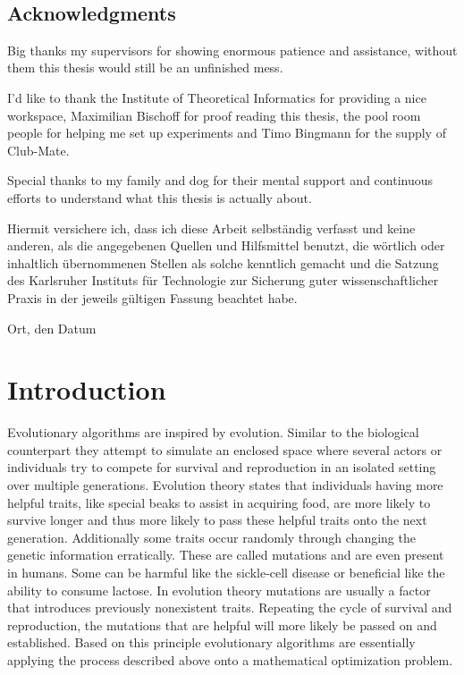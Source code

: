 \documentclass[a4paper,12pt,titlepage, BCOR7mm,headsepline]{scrbook}
\numberwithin{equation}{section}
\begin{document}
\vfill\vfill\vfill
\ 
\newpage
\clearpage
\ 
\newpage
\clearpage

\section*{Acknowledgments}
Big thanks my supervisors for showing enormous patience and assistance, without them this thesis would still be an unfinished mess. 

I'd like to thank the Institute of Theoretical Informatics for providing a nice workspace, Maximilian Bischoff for proof reading this thesis, 
the pool room people for helping me set up experiments and Timo Bingmann for the supply of Club-Mate. 

Special thanks to my family and dog for their mental support and continuous efforts to understand what this thesis is actually about. 

\vfill\vfill\vfill
Hiermit versichere ich, dass ich diese Arbeit selbständig verfasst und keine anderen, als die angegebenen Quellen und Hilfsmittel benutzt, die wörtlich oder inhaltlich übernommenen Stellen als solche kenntlich gemacht und die Satzung des Karlsruher Instituts für Technologie zur Sicherung guter wissenschaftlicher Praxis in der jeweils gültigen Fassung beachtet habe.

\bigskip
\vspace*{1cm}
\noindent
Ort, den Datum

\clearpage

\tableofcontents
\clearpage
\clearpage
\mainmatter
\pagestyle{plain}
\chapter{Introduction}
\pagestyle{headings}
Evolutionary algorithms are inspired by evolution. Similar to the biological counterpart they attempt to simulate 
an enclosed space where several actors or individuals try to compete for survival and reproduction in an isolated setting over multiple generations.
Evolution theory states that individuals having more helpful traits, like special beaks to assist in acquiring food, are more likely to survive longer and 
thus more likely to pass these helpful traits onto the next generation. Additionally some traits occur randomly through changing the genetic information erratically. These are called mutations and are even present in humans. Some can be harmful like the sickle-cell disease or beneficial like the ability to consume lactose. In evolution theory mutations 
are usually a factor that introduces previously nonexistent traits. Repeating the cycle of survival and reproduction, the mutations that are helpful will more likely be passed on and established. Based on this principle evolutionary algorithms are essentially applying the process described above onto a mathematical optimization problem. 
%
%
%
%
%
%
\end{document}
